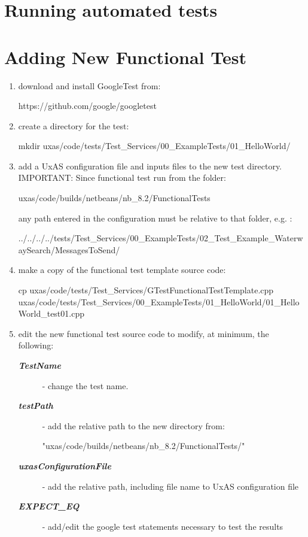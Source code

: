 \section{Running automated tests}
\section{Adding New Functional Test}


\begin{enumerate}
  \item download and install GoogleTest from:
\begin{docspec}
	https://github.com/google/googletest
\end{docspec} 

  \item create a directory for the test:
\begin{docspec}
	mkdir uxas/code/tests/Test\_Services/00\_ExampleTests/01\_HelloWorld/
\end{docspec} 

  \item add a UxAS configuration file and inputs files to the new test directory. IMPORTANT: Since functional test run from the folder:
\begin{docspec}
  uxas/code/builds/netbeans/nb\_8.2/FunctionalTests
\end{docspec}
any path entered in the configuration must be relative to that folder, e.g. :
\begin{docspec}
../../../../tests/Test\_Services/00\_ExampleTests/02\_Test\_Example\_WaterwaySearch/MessagesToSend/
\end{docspec} 

  \item make a copy of the functional test template source code:
\begin{docspec}
	cp uxas/code/tests/Test\_Services/GTestFunctionalTestTemplate.cpp uxas/code/tests/Test\_Services/00\_ExampleTests/01\_HelloWorld/01\_HelloWorld\_test01.cpp
\end{docspec} 

  \item edit the new functional test source code to modify, at minimum, the following:
	\begin{description}
	\item[\textbf{\textit{TestName}}] - change the test name.
	\item[\textbf{\textit{testPath}}] - add the relative path to the new directory from:
\begin{docspec}
		"uxas/code/builds/netbeans/nb\_8.2/FunctionalTests/"
\end{docspec} 
	\item[\textbf{\textit{uxasConfigurationFile}}] - add the relative path, including file name to UxAS configuration file
	\item[\textbf{\textit{EXPECT\_EQ}}] - add/edit the google test statements necessary to test the results


\end{description}
\end{enumerate}
